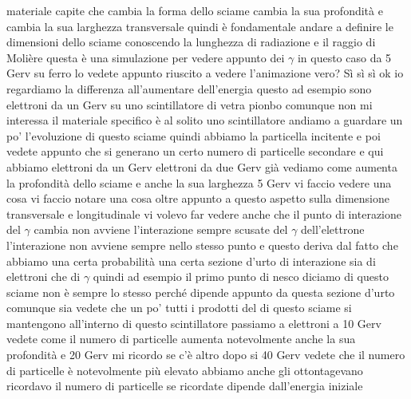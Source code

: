 {materiale capite che cambia la forma dello sciame cambia la sua profondità e cambia la sua larghezza transversale quindi è fondamentale andare a definire le dimensioni dello sciame conoscendo la lunghezza di radiazione e il raggio di Molière questa è una simulazione per vedere appunto dei $\gamma$ in questo caso da 5 Gerv su ferro lo vedete appunto riuscito a vedere l'animazione vero? Sì sì sì ok io regardiamo la differenza all'aumentare dell'energia questo ad esempio sono elettroni da un Gerv su uno scintillatore di vetra pionbo comunque non mi interessa il materiale specifico è al solito uno scintillatore andiamo a guardare un po' l'evoluzione di questo sciame quindi abbiamo la particella incitente e poi vedete appunto che si generano un certo numero di particelle secondare e qui abbiamo elettroni da un Gerv elettroni da due Gerv già vediamo come aumenta la profondità dello sciame e anche la sua larghezza 5 Gerv vi faccio vedere una cosa vi faccio notare una cosa oltre appunto a questo aspetto sulla dimensione transversale e longitudinale vi volevo far vedere anche che il punto di interazione del $\gamma$ cambia non avviene l'interazione sempre scusate del $\gamma$ dell'elettrone l'interazione non avviene sempre nello stesso punto e questo deriva dal fatto che abbiamo una certa probabilità una certa sezione d'urto di interazione sia di elettroni che di $\gamma$ quindi ad esempio il primo punto di nesco diciamo di questo sciame non è sempre lo stesso perché dipende appunto da questa sezione d'urto comunque sia vedete che un po' tutti i prodotti del di questo sciame si mantengono all'interno di questo scintillatore passiamo a elettroni a 10 Gerv vedete come il numero di particelle aumenta notevolmente anche la sua profondità e 20 Gerv mi ricordo se c'è altro dopo si 40 Gerv vedete che il numero di particelle è notevolmente più elevato abbiamo anche gli ottontagevano ricordavo il numero di particelle se ricordate dipende dall'energia iniziale
}